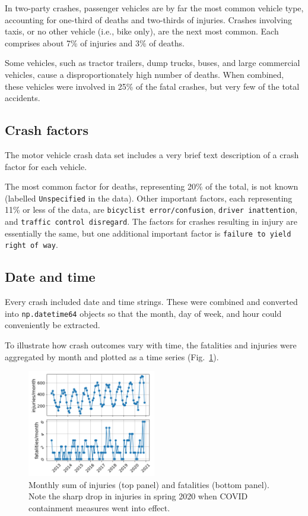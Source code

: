 \documentclass[twocolumn,oneside]{article}
\begin{document}
In two-party crashes, passenger vehicles are by far the most common
vehicle type, accounting for one-third of deaths and two-thirds of
injuries.  Crashes involving taxis, or no other vehicle (i.e., bike
only), are the next most common.  Each comprises about 7\% of injuries
and 3\% of deaths.

Some vehicles, such as tractor trailers, dump trucks, buses, and large
commercial vehicles, cause a disproportionately high number of deaths.
When combined, these vehicles were involved in 25\% of the fatal
crashes, but very few of the total accidents.


\subsection{Crash factors}

The motor vehicle crash data set includes a very brief text
description of a crash factor for each vehicle.

The most common factor for deaths, representing 20\% of the total, is
not known (labelled \verb+Unspecified+ in the data).  Other important
factors, each representing 11\% or less of the data, are
\verb+bicyclist error/confusion+, \verb+driver inattention+, and
\verb+traffic control disregard+.  The factors for crashes resulting
in injury are essentially the same, but one additional important
factor is \verb+failure to yield right of way+.


\subsection{Date and time}

Every crash included date and time strings.  These were combined and
converted into \verb+np.datetime64+ objects so that the month, day of
week, and hour could conveniently be extracted.

To illustrate how crash outcomes vary with time, the fatalities and
injuries were aggregated by month and plotted as a time series
(Fig.~\ref{fig:timeseries}).

\begin{figure}[h]
\centering
  \includegraphics[width=0.5\textwidth]{../figs/time_series.png}
  \caption{Monthly sum of injuries (top panel) and fatalities
    (bottom panel).  Note the sharp drop in injuries in spring 2020
    when COVID containment measures went into effect.}
\label{fig:timeseries}
\end{figure}
\end{document}

